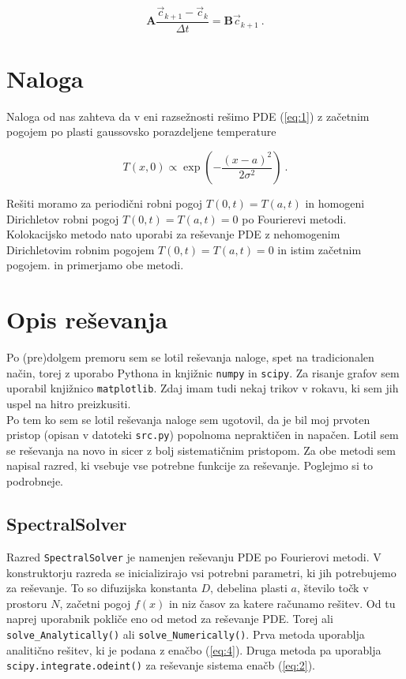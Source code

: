 \documentclass[a4paper]{article}
\begin{document}
\begin{equation}
    \mathbf{A}\frac{\vec{c}_{k+1}-\vec{c}_k}{\Delta t} = \mathbf{B}\vec{c}_{k+1}\>.
\end{equation}

\section{Naloga}
Naloga od nas zahteva da v eni razsežnosti rešimo PDE (\ref{eq:1}) z začetnim pogojem
po plasti gaussovsko porazdeljene temperature

\begin{equation}
    T(x, 0) \propto \exp{\left(-\frac{(x-a)^2}{2\sigma^2}\right)}\>.
\end{equation}

Rešiti moramo za periodični robni pogoj $T(0, t) = T(a, t)$ in homogeni Dirichletov robni pogoj
$T(0, t) = T(a, t) = 0$ po Fourierevi metodi. Kolokacijsko metodo nato uporabi za reševanje
PDE z nehomogenim Dirichletovim robnim pogojem $T(0, t) = T(a, t) = 0$ in istim začetnim pogojem.
in primerjamo obe metodi.\\

\section{Opis reševanja}
Po (pre)dolgem premoru sem se lotil reševanja naloge, spet na tradicionalen način, torej z uporabo 
Pythona in knjižnic \texttt{numpy} in \texttt{scipy}. Za risanje grafov sem uporabil knjižnico
\texttt{matplotlib}. Zdaj imam tudi nekaj trikov v rokavu, ki sem jih uspel na hitro preizkusiti.\\

Po tem ko sem se lotil reševanja naloge sem ugotovil, da je bil moj prvoten pristop (opisan v 
datoteki \texttt{src.py}) popolnoma nepraktičen in napačen. Lotil sem se reševanja na novo in sicer
z bolj sistematičnim pristopom. Za obe metodi sem napisal razred, ki vsebuje vse potrebne funkcije
za reševanje. Poglejmo si to podrobneje.\\

\subsection{SpectralSolver}
Razred \texttt{SpectralSolver} je namenjen reševanju PDE po Fourierovi metodi. V konstruktorju
razreda se inicializirajo vsi potrebni parametri, ki jih potrebujemo za reševanje. To so 
difuzijska konstanta $D$, debelina plasti $a$, število točk v prostoru $N$, začetni pogoj $f(x)$ in
niz časov za katere računamo rešitev. Od tu naprej uporabnik pokliče eno od metod za reševanje
PDE. Torej ali \texttt{solve\_Analytically()} ali \texttt{solve\_Numerically()}. Prva metoda uporablja
analitično rešitev, ki je podana z enačbo (\ref{eq:4}). Druga metoda pa uporablja
\texttt{scipy.integrate.odeint()} za reševanje sistema enačb (\ref{eq:2}).\\
\end{document}
